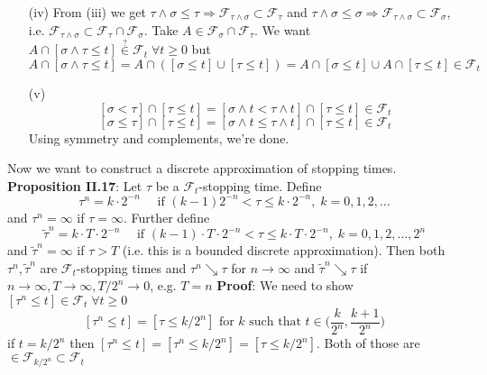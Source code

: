 \documentclass[english]{article}
\newcommand{\note}[1]{\noindent\textbf{#1}}
\newcommand{\F}{\mathcal F}
\begin{document}
\begin{enumerate}
\item[(iv)] From (iii) we get $\tau\wedge \sigma \leq \tau \Rightarrow \F_{\tau \wedge \sigma} \subset \F_\tau$ and $\tau \wedge \sigma \leq \sigma \Rightarrow \F_{\tau \wedge \sigma} \subset \F_\sigma$, i.e. $\F_{\tau\wedge \sigma} \subset \F_\tau \cap \F_\sigma$.\newline
Take $A\in \F_\sigma \cap \F_\tau$. We want $A\cap [\sigma\wedge \tau \leq t] \stackrel ?\in \F_t\; \forall t \geq 0$ but
$$A\cap [\sigma \wedge \tau \leq t] = A\cap ([\sigma \leq t] \cup [\tau \leq t]) = A\cap [\sigma \leq t] \cup A\cap [\tau \leq t] \in \F_t$$
\item[(v)]
$$[\sigma < \tau] \cap [ \tau \leq t] = [\sigma \wedge t < \tau \wedge t] \cap [\tau \leq t] \in \F_t$$
$$[\sigma \leq \tau ] \cap [\tau \leq t] = [\sigma \wedge t \leq \tau \wedge t] \cap [\tau \leq t] \in \F_t$$
Using symmetry and complements, we're done.
\end{enumerate}

Now we want to construct a discrete approximation of stopping times. \newline
\note{Proposition II.17}: Let $\tau$ be a $\F_t$-stopping time. Define
$$\tau^n = k\cdot 2^{-n} \quad \text{ if }(k-1)2^{-n} < \tau \leq k\cdot 2^{-n},\; k=0, 1,2,\dots$$
and $\tau^n = \infty$ if $\tau=\infty$. Further define
$$\tilde\tau^n = k\cdot T \cdot 2^{-n} \quad \text{ if } (k-1) \cdot T \cdot 2^{-n} < \tau \leq k\cdot T \cdot 2^{-n},\; k=0,1,2,\dots, 2^n$$
and $\tilde \tau^n = \infty$ if $\tau>T$ (i.e. this is a bounded discrete approximation). \newline
Then both $\tau^n, \tilde\tau^n$ are $\F_t$-stopping times and $\tau^n \searrow \tau$ for $n\to \infty$ and $\tilde\tau^n \searrow \tau$ if $n\to \infty, T\to \infty, T/2^n \to 0$, e.g. $T=n$ \newline
\note{Proof}: We need to show $[\tau^n \leq t] \in \F_t \; \forall t \geq 0$
$$[\tau^n \leq t] = [\tau \leq k/2^n] \text{ for }k\text{ such that } t \in \Big( \frac k{2^n}, \frac{k+1}{2^n} \Big)$$
if $t = k /2^n$ then $[\tau^n \leq t ] = [\tau^n \leq k/2^n] = [\tau \leq k / 2^n]$. Both of those are $\in \F_{k/2^n} \subset \F_t$ \newline
\end{document}
